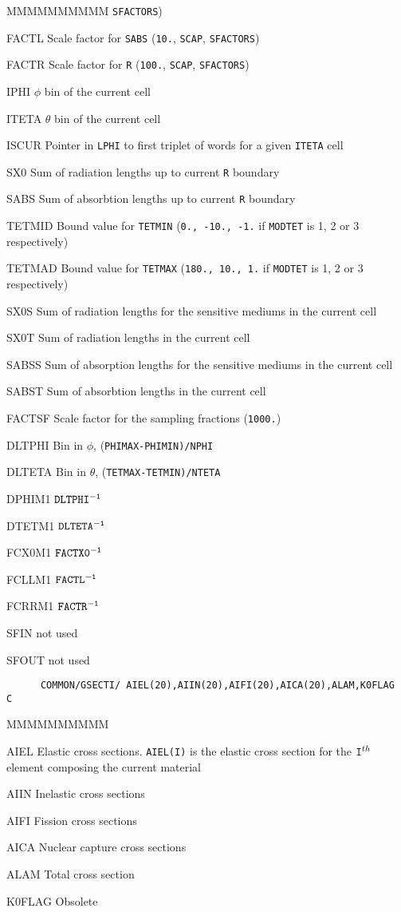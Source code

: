 \begin{DLtt}{MMMMMMMMMM}
{\tt SFACTORS})
\item[FACTL] Scale factor for {\tt SABS} ({\tt 10.}, {\tt SCAP},
{\tt SFACTORS})
\item[FACTR] Scale factor for {\tt R} ({\tt 100.},
{\tt SCAP}, {\tt SFACTORS})
\item[IPHI]  $\phi$ bin of the current cell
\item[ITETA] $\theta$ bin of the current cell
\item[ISCUR] Pointer in {\tt LPHI} to first triplet of words for a
given {\tt ITETA} cell
\item[SX0] Sum of radiation lengths up to current {\tt R} boundary
\item[SABS] Sum of absorbtion lengths up to current {\tt R} boundary
\item[TETMID] Bound value for {\tt TETMIN} ({\tt 0., -10., -1.} if
{\tt MODTET} is 1, 2 or 3 respectively)
\item[TETMAD] Bound value for {\tt TETMAX} ({\tt 180., 10., 1.} if
{\tt MODTET} is 1, 2 or 3 respectively)
\item[SX0S] Sum of radiation lengths for the sensitive mediums in the
current cell
\item[SX0T] Sum of radiation lengths in the current cell
\item[SABSS] Sum of absorption lengths for the sensitive mediums in
the current cell
\item[SABST] Sum of absorbtion lengths in the current cell
\item[FACTSF] Scale factor for the sampling fractions ({\tt 1000.})
\item[DLTPHI] Bin in $\phi$, ({\tt PHIMAX-PHIMIN)/NPHI}
\item[DLTETA] Bin in $\theta$, ({\tt TETMAX-TETMIN)/NTETA}
\item[DPHIM1] ${\tt DLTPHI^{-1}}$
\item[DTETM1] ${\tt DLTETA^{-1}}$
\item[FCX0M1] ${\tt FACTX0^{-1}}$
\item[FCLLM1] ${\tt FACTL^{-1}}$
\item[FCRRM1] ${\tt FACTR^{-1}}$
\item[SFIN] not used
\item[SFOUT] not used
\end{DLtt}
\begin{verbatim}
      COMMON/GSECTI/ AIEL(20),AIIN(20),AIFI(20),AICA(20),ALAM,K0FLAG
C
\end{verbatim}
\begin{DLtt}{MMMMMMMMMM}
\item[AIEL]Elastic cross sections. {\tt AIEL(I)} is the elastic cross section
for the ${\tt I}^{th}$ element composing the current material
\item[AIIN]Inelastic cross sections
\item[AIFI]Fission cross sections
\item[AICA]Nuclear capture cross sections
\item[ALAM]Total cross section
\item[K0FLAG]Obsolete
\end{DLtt}
